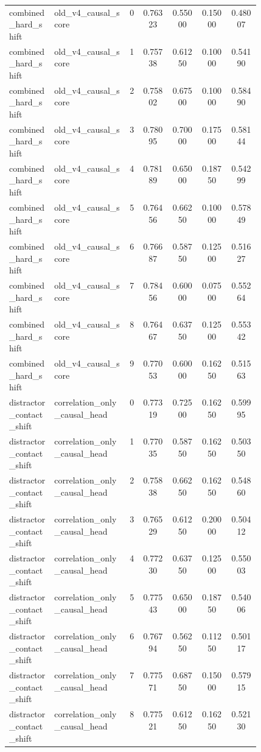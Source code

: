 \documentclass{article}
\begin{document}
\begin{center}
\begin{longtable}{p{0.18\linewidth}p{0.30\linewidth}ccccc}
combined\_hard\_shift & old\_v4\_causal\_score & 0 & 0.76323 & 0.55000 & 0.15000 & 0.48007\\
combined\_hard\_shift & old\_v4\_causal\_score & 1 & 0.75738 & 0.61250 & 0.10000 & 0.54190\\
combined\_hard\_shift & old\_v4\_causal\_score & 2 & 0.75802 & 0.67500 & 0.10000 & 0.58490\\
combined\_hard\_shift & old\_v4\_causal\_score & 3 & 0.78095 & 0.70000 & 0.17500 & 0.58144\\
combined\_hard\_shift & old\_v4\_causal\_score & 4 & 0.78189 & 0.65000 & 0.18750 & 0.54299\\
combined\_hard\_shift & old\_v4\_causal\_score & 5 & 0.76456 & 0.66250 & 0.10000 & 0.57849\\
combined\_hard\_shift & old\_v4\_causal\_score & 6 & 0.76687 & 0.58750 & 0.12500 & 0.51627\\
combined\_hard\_shift & old\_v4\_causal\_score & 7 & 0.78456 & 0.60000 & 0.07500 & 0.55264\\
combined\_hard\_shift & old\_v4\_causal\_score & 8 & 0.76467 & 0.63750 & 0.12500 & 0.55342\\
combined\_hard\_shift & old\_v4\_causal\_score & 9 & 0.77053 & 0.60000 & 0.16250 & 0.51563\\
distractor\_contact\_shift & correlation\_only\_causal\_head & 0 & 0.77319 & 0.72500 & 0.16250 & 0.59995\\
distractor\_contact\_shift & correlation\_only\_causal\_head & 1 & 0.77035 & 0.58750 & 0.16250 & 0.50350\\
distractor\_contact\_shift & correlation\_only\_causal\_head & 2 & 0.75838 & 0.66250 & 0.16250 & 0.54860\\
distractor\_contact\_shift & correlation\_only\_causal\_head & 3 & 0.76529 & 0.61250 & 0.20000 & 0.50412\\
distractor\_contact\_shift & correlation\_only\_causal\_head & 4 & 0.77230 & 0.63750 & 0.12500 & 0.55003\\
distractor\_contact\_shift & correlation\_only\_causal\_head & 5 & 0.77543 & 0.65000 & 0.18750 & 0.54006\\
distractor\_contact\_shift & correlation\_only\_causal\_head & 6 & 0.76794 & 0.56250 & 0.11250 & 0.50117\\
distractor\_contact\_shift & correlation\_only\_causal\_head & 7 & 0.77571 & 0.68750 & 0.15000 & 0.57915\\
distractor\_contact\_shift & correlation\_only\_causal\_head & 8 & 0.77521 & 0.61250 & 0.16250 & 0.52130\\

\end{longtable}
\end{center}
\end{document}
